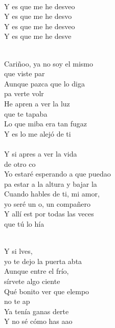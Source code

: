\begin{cancion}[titulo=Desvelao, autor=Serko, cejilla=4]
\begin{chorus}
\jump\\
	Y es que me he desveo\\
	Y es que me he desvo\\
	Y es que me he desveo \\
	Y es que me he desve\\
	\end{chorus}%
	\jump\\
	Cariñoo, ya no soy el mismo  \\
	que viste par\\
	Aunque pazca que lo diga \\
	pa verte volr\\
	He apren a ver la luz \\
	que te tapaba \\
	Lo que miba era tan fugaz\\
	Y es lo  me alejó de ti\\
\jump\\
	Y si apres a ver la vida \\
	de otro co\\
	Yo estaré esperando a que puedao \\
	pa estar a la altura y bajar la \\
	Cuando hables de ti, mi amor, \\
	yo seré un o, un compañero\\
	Y allí est por todas las veces  \\
	que tú lo hía\\\jump\\
	\begin{chorus}%
	Y si lves, \\
	yo te dejo la puerta abta\\
Aunque entre el frío, \\
	sírvete algo ciente\\
	Qué bonito ver que elempo \\
	no te ap \\
	Ya tenía ganas derte\\
	Y no sé cómo has aao \\

\end{chorus}
\end{cancion}
